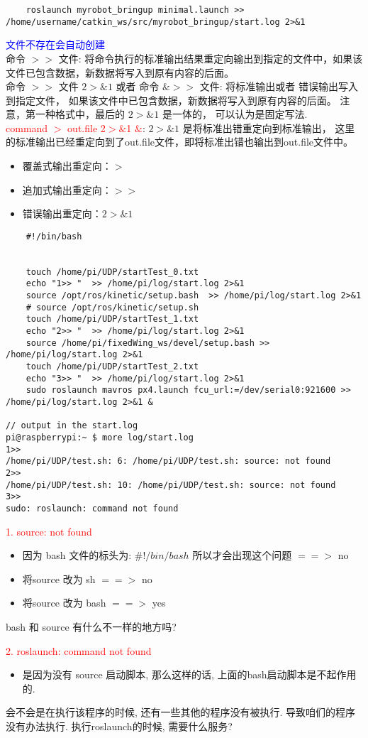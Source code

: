 \begin{lstlisting}
    roslaunch myrobot_bringup minimal.launch >> /home/username/catkin_ws/src/myrobot_bringup/start.log 2>&1
\end{lstlisting}
\textcolor{blue}{文件不存在会自动创建}\\
命令 $>>$ 文件: 将命令执行的标准输出结果重定向输出到指定的文件中，如果该文件已包含数据，新数据将写入到原有内容的后面。\\
命令 $>>$ 文件 $2>\&1$ 或者 命令 $\&>>$ 文件: 将标准输出或者
错误输出写入到指定文件，
如果该文件中已包含数据，新数据将写入到原有内容的后面。
注意，第一种格式中，最后的 $2>\&1$ 是一体的，
可以认为是固定写法. \\
\textcolor{red}{command $>$ out.file  2$>\&$1 $\&$}: 
$2>\&1$ 是将标准出错重定向到标准输出，
这里的标准输出已经重定向到了out.file文件，即将标准出错也输出到out.file文件中。

\begin{itemize}
    \item 覆盖式输出重定向：$>$ 
    \item 追加式输出重定向：$>>$
    \item 错误输出重定向：$2>\&1$
\end{itemize}

\begin{lstlisting}
    #!/bin/bash


    touch /home/pi/UDP/startTest_0.txt
    echo "1>> "  >> /home/pi/log/start.log 2>&1
    source /opt/ros/kinetic/setup.bash  >> /home/pi/log/start.log 2>&1
    # source /opt/ros/kinetic/setup.sh
    touch /home/pi/UDP/startTest_1.txt
    echo "2>> "  >> /home/pi/log/start.log 2>&1
    source /home/pi/fixedWing_ws/devel/setup.bash >> /home/pi/log/start.log 2>&1
    touch /home/pi/UDP/startTest_2.txt
    echo "3>> "  >> /home/pi/log/start.log 2>&1
    sudo roslaunch mavros px4.launch fcu_url:=/dev/serial0:921600 >> /home/pi/log/start.log 2>&1 &
    
// output in the start.log
pi@raspberrypi:~ $ more log/start.log 
1>> 
/home/pi/UDP/test.sh: 6: /home/pi/UDP/test.sh: source: not found
2>> 
/home/pi/UDP/test.sh: 10: /home/pi/UDP/test.sh: source: not found
3>> 
sudo: roslaunch: command not found
\end{lstlisting}\par
\textcolor{red}{1. source: not found} \\
\begin{itemize}
    \item 因为 bash 文件的标头为: $\#!/bin/bash$ 所以才会出现这个问题 $==>$ no
    \item 将source 改为 sh  $==>$ no
    \item 将source 改为 bash  $==>$ yes 
\end{itemize}

bash 和 source 有什么不一样的地方吗? \par
\textcolor{red}{2. roslaunch: command not found}\\
\begin{itemize}
    \item 是因为没有 source 启动脚本, 那么这样的话, 上面的bash启动脚本是不起作用的. 
\end{itemize}

会不会是在执行该程序的时候, 还有一些其他的程序没有被执行. 导致咱们的程序没有办法执行. 
执行roslaunch的时候, 需要什么服务?
